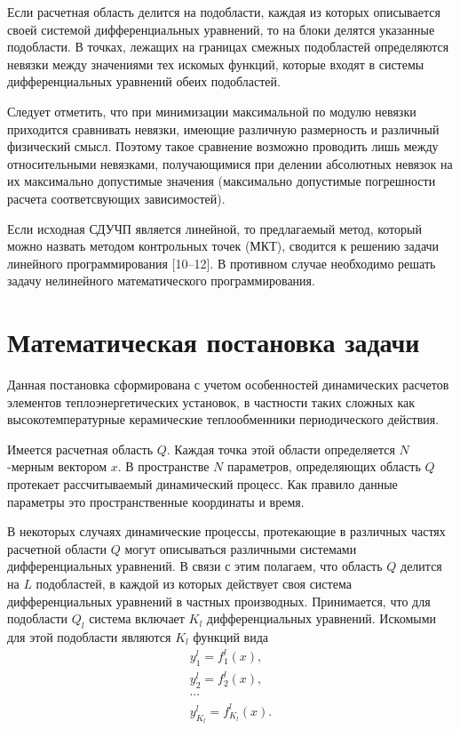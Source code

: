 \documentclass[a4paper,12pt]{article}
\begin{document}
Если расчетная область делится на подобласти, каждая из которых описывается
своей системой дифференциальных уравнений, то на блоки делятся указанные
подобласти. В точках, лежащих на границах смежных подобластей определяются
невязки между значениями тех искомых функций, которые входят в системы
дифференциальных уравнений обеих подобластей.

Следует отметить, что при минимизации максимальной по модулю невязки
приходится сравнивать невязки, имеющие различную размерность и различный
физический смысл.  Поэтому такое сравнение возможно проводить лишь между
относительными невязками, получающимися при делении абсолютных невязок на
их максимально допустимые значения (максимально допустимые погрешности
расчета соответсвующих зависимостей).

Если исходная СДУЧП является линейной, то предлагаемый метод, который можно
назвать методом контрольных точек (МКТ), сводится к решению задачи
линейного программирования [10--12]. В противном случае необходимо
решать задачу нелинейного математического программирования.

\section{Математическая постановка задачи}

Данная постановка сформирована с учетом особенностей динамических расчетов
элементов теплоэнергетических установок, в частности таких сложных как
высокотемпературные керамические теплообменники периодического действия.

Имеется расчетная область $Q$. Каждая точка этой области определяется
$N$-мерным вектором $x$. В пространстве $N$ параметров, определяющих
область $Q$ протекает рассчитываемый динамический процесс. Как правило
данные параметры это пространственные координаты и время.

В некоторых случаях динамические процессы, протекающие в различных частях
расчетной области $Q$ могут описываться различными системами
дифференциальных уравнений. В связи с этим полагаем, что область $Q$
делится на $L$ подобластей, в каждой из которых действует своя система
дифференциальных уравнений в частных производных. Принимается, что для
подобласти $Q_l$ система включает $K_l$ дифференциальных уравнений.
Искомыми для этой подобласти являются $K_l$ функций вида
\begin{equation} 
    \begin{array}{ll} 
        y^l_1=f^l_1(x), \\ 
        y^l_2=f^l_2(x), \\
        \cdots \\ 
        y^l_{K_l}=f^l_{K_l}(x).  
    \end{array} 
    \label{desir-fnc}
\end{equation}
\end{document}
